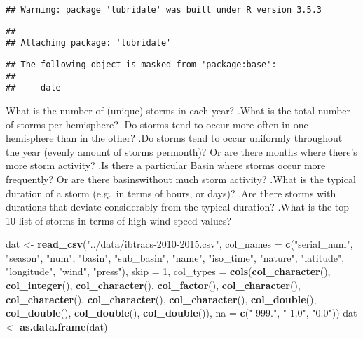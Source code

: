 \documentclass[]{article}
\newenvironment{Shaded}{\begin{snugshade}}{\end{snugshade}}
\newcommand{\KeywordTok}[1]{\textcolor[rgb]{0.13,0.29,0.53}{\textbf{#1}}}
\newcommand{\DataTypeTok}[1]{\textcolor[rgb]{0.13,0.29,0.53}{#1}}
\newcommand{\DecValTok}[1]{\textcolor[rgb]{0.00,0.00,0.81}{#1}}
\newcommand{\StringTok}[1]{\textcolor[rgb]{0.31,0.60,0.02}{#1}}
\newcommand{\NormalTok}[1]{#1}
\begin{document}
\begin{verbatim}
## Warning: package 'lubridate' was built under R version 3.5.3
\end{verbatim}

\begin{verbatim}
## 
## Attaching package: 'lubridate'
\end{verbatim}

\begin{verbatim}
## The following object is masked from 'package:base':
## 
##     date
\end{verbatim}

What is the number of (unique) storms in each year? .What is the total
number of storms per hemisphere? .Do storms tend to occur more often in
one hemisphere than in the other? .Do storms tend to occur uniformly
throughout the year (evenly amount of storms permonth)? Or are there
months where there's more storm activity? .Is there a particular Basin
where storms occur more frequently? Or are there basinswithout much
storm activity? .What is the typical duration of a storm (e.g.~in terms
of hours, or days)? .Are there storms with durations that deviate
considerably from the typical duration? .What is the top-10 list of
storms in terms of high wind speed values?

\begin{Shaded}
\begin{Highlighting}[]
\NormalTok{dat <-}\StringTok{ }\KeywordTok{read_csv}\NormalTok{(}\StringTok{"../data/ibtracs-2010-2015.csv"}\NormalTok{, }\DataTypeTok{col_names =} \KeywordTok{c}\NormalTok{(}\StringTok{"serial_num"}\NormalTok{, }\StringTok{"season"}\NormalTok{, }\StringTok{"num"}\NormalTok{, }\StringTok{"basin"}\NormalTok{, }\StringTok{"sub_basin"}\NormalTok{, }\StringTok{"name"}\NormalTok{, }\StringTok{"iso_time"}\NormalTok{, }\StringTok{"nature"}\NormalTok{, }\StringTok{"latitude"}\NormalTok{, }\StringTok{"longitude"}\NormalTok{, }\StringTok{"wind"}\NormalTok{, }\StringTok{"press"}\NormalTok{), }\DataTypeTok{skip =} \DecValTok{1}\NormalTok{, }\DataTypeTok{col_types =} \KeywordTok{cols}\NormalTok{(}\KeywordTok{col_character}\NormalTok{(), }\KeywordTok{col_integer}\NormalTok{(), }\KeywordTok{col_character}\NormalTok{(), }\KeywordTok{col_factor}\NormalTok{(), }\KeywordTok{col_character}\NormalTok{(), }\KeywordTok{col_character}\NormalTok{(), }\KeywordTok{col_character}\NormalTok{(), }\KeywordTok{col_character}\NormalTok{(), }\KeywordTok{col_double}\NormalTok{(), }\KeywordTok{col_double}\NormalTok{(), }\KeywordTok{col_double}\NormalTok{(), }\KeywordTok{col_double}\NormalTok{()), }\DataTypeTok{na =} \KeywordTok{c}\NormalTok{(}\StringTok{"-999."}\NormalTok{, }\StringTok{"-1.0"}\NormalTok{, }\StringTok{"0.0"}\NormalTok{))}
\NormalTok{dat <-}\StringTok{ }\KeywordTok{as.data.frame}\NormalTok{(dat)}
\end{Highlighting}
\end{Shaded}
\end{document}
